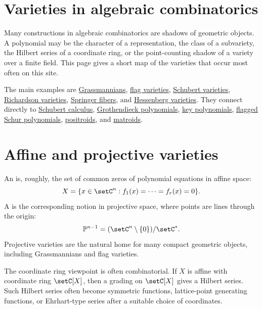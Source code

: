 
\section[varieties]{Varieties in algebraic combinatorics}

Many constructions in algebraic combinatorics are shadows of geometric
objects.  A polynomial may be the character of a representation, the class of
a subvariety, the Hilbert series of a coordinate ring, or the point-counting
shadow of a variety over a finite field.  This page gives a short map of the
varieties that occur most often on this site.

The main examples are \hyperref[grassmannianVarieties]{Grassmannians},
\hyperref[flagVarieties]{flag varieties},
\hyperref[schubertVarietiesAndMatroids]{Schubert varieties},
\hyperref[richardsonVarieties]{Richardson varieties},
\hyperref[springerFibers]{Springer fibers}, and
\hyperref[hessenbergVarietiesBackground]{Hessenberg varieties}.  They connect
directly to \hyperref[schubertCalculus]{Schubert calculus},
\hyperref[grothendieck]{Grothendieck polynomials},
\hyperref[key]{key polynomials}, \hyperref[schurFlagged]{flagged Schur
polynomials}, \hyperref[positroid]{positroids}, and
\hyperref[matroid]{matroids}.


\section[affineProjectiveVarieties]{Affine and projective varieties}

An \label{affineVarietyDefinition} is, roughly, the set
of common zeros of polynomial equations in affine space:
\[
  X=\{x\in\setC^n:f_1(x)=\dotsb=f_r(x)=0\}.
\]
A \label{projectiveVarietyDefinition} is the
corresponding notion in projective space, where points are lines through the
origin:
\[
  \mathbb P^{n-1}
  =
  (\setC^n\setminus\{0\})/\setC^\ast.
\]
Projective varieties are the natural home for many compact geometric objects,
including Grassmannians and flag varieties.

The coordinate ring viewpoint is often combinatorial.  If $X$ is affine with
coordinate ring $\setC[X]$, then a grading on $\setC[X]$ gives a Hilbert
series.  Such Hilbert series often become symmetric functions, lattice-point
generating functions, or Ehrhart-type series after a suitable choice of
coordinates.


